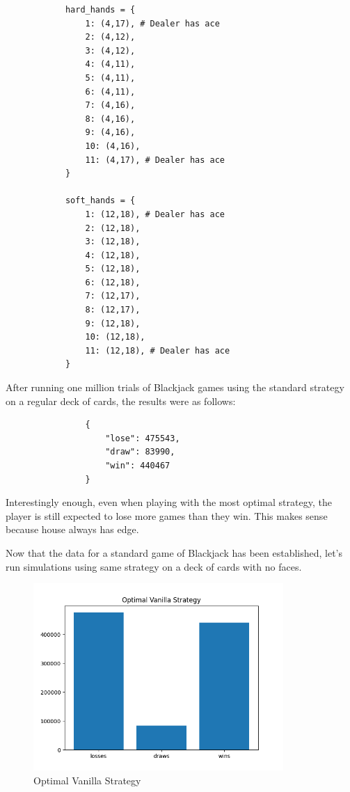 \documentclass{article}
\begin{document}
    \begin{verbatim}
			hard_hands = {
				1: (4,17), # Dealer has ace
				2: (4,12),
				3: (4,12),
				4: (4,11),
				5: (4,11),
				6: (4,11),
				7: (4,16),
				8: (4,16),
				9: (4,16),
				10: (4,16),
				11: (4,17), # Dealer has ace
			}

			soft_hands = {
				1: (12,18), # Dealer has ace
				2: (12,18), 
				3: (12,18), 
				4: (12,18), 
				5: (12,18), 
				6: (12,18), 
				7: (12,17), 
				8: (12,17), 
				9: (12,18), 
				10: (12,18), 
				11: (12,18), # Dealer has ace
			}
        \end{verbatim}

        \hspace{-0.5cm}After running one million trials of Blackjack games using the standard strategy on a regular deck of cards, the results 
		were as follows:

        \begin{verbatim}
                {
                    "lose": 475543,
                    "draw": 83990,
                    "win": 440467
                }
        \end{verbatim}

		Interestingly enough, even when playing with the most optimal strategy, the player is still expected to lose more games than they win.
		This makes sense because house always has edge.

		Now that the data for a standard game of Blackjack has been established, let's run simulations using same strategy on a deck of cards 
		with no faces.
        
		\begin{figure}
			\hypertarget{fig2}{}
			\begin{center}
				\includegraphics[width=9.5cm]{optimalV.png}
			\end{center}
			\vspace{-10mm}
			\caption{Optimal Vanilla Strategy}
		\end{figure}
		\vspace{2.5cm}
\end{document}
